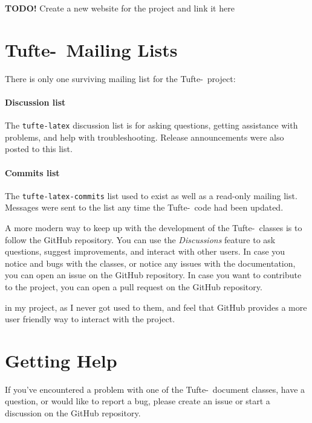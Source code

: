 \documentclass[a4paper]{tufte-handout}
\newcommand{\TL}{Tufte-\hologo{LaTeX}\xspace}
\newcommand{\TODO}[1]{\textcolor{tufte-red}{\textbf{TODO!} #1}\xspace}
\begin{document}
\TODO{Create a new website for the project and link it here}


\section{\TL\ Mailing Lists}\label{sec:mailing-lists}
There is only one surviving mailing list for the \TL\ project:

\paragraph{Discussion list}
The \texttt{tufte-latex} discussion list is for asking questions, getting assistance with problems, and help with troubleshooting. 
Release announcements were also posted to this list.%

\paragraph{Commits list}
The \texttt{tufte-latex-commits} list used to exist as well as a read-only mailing list. 
Messages were sent to the list any time the \TL\ code had been updated.%

A more modern way to keep up with the development of the \TL\ classes is to follow the GitHub repository.
You can use the \textit{Discussions} feature to ask questions, suggest improvements, and interact with other users.%
In case you notice and bugs with the classes, or notice any issues with the documentation, you can open an issue on the GitHub repository.%
In case you want to contribute to the project, you can open a pull request on the GitHub repository.%

 in my project, as I never got used to them, and feel that GitHub provides a more user friendly way to interact with the project.


\section{Getting Help}\label{sec:getting-help}
If you've encountered a problem with one of the \TL\ document classes, have a question, or would like to report a bug, please create an issue or start a discussion on the GitHub repository.
\end{document}
